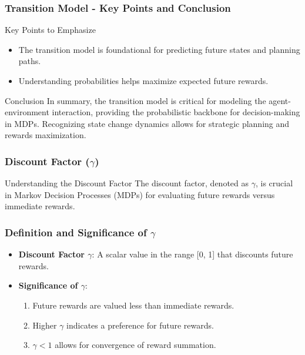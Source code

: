 \documentclass[aspectratio=169]{beamer}
\begin{document}
\begin{frame}[fragile]
    \frametitle{Transition Model - Key Points and Conclusion}
    \begin{block}{Key Points to Emphasize}
        \begin{itemize}
            \item The transition model is foundational for predicting future states and planning paths.
            \item Understanding probabilities helps maximize expected future rewards.
        \end{itemize}
    \end{block}
    \begin{block}{Conclusion}
        In summary, the transition model is critical for modeling the agent-environment interaction, providing the probabilistic backbone for decision-making in MDPs. 
        Recognizing state change dynamics allows for strategic planning and rewards maximization.
    \end{block}
\end{frame}

\begin{frame}[fragile]
    \frametitle{Discount Factor (\( \gamma \))}
    \begin{block}{Understanding the Discount Factor}
        The discount factor, denoted as \( \gamma \), is crucial in Markov Decision Processes (MDPs) for evaluating future rewards versus immediate rewards.
    \end{block}
\end{frame}

\begin{frame}[fragile]
    \frametitle{Definition and Significance of \( \gamma \)}
    \begin{itemize}
        \item \textbf{Discount Factor \( \gamma \)}: A scalar value in the range [0, 1] that discounts future rewards.
        \item \textbf{Significance of \( \gamma \)}:
        \begin{enumerate}
            \item Future rewards are valued less than immediate rewards.
            \item Higher \( \gamma \) indicates a preference for future rewards.
            \item \( \gamma < 1 \) allows for convergence of reward summation.
        \end{enumerate}
    \end{itemize}
\end{frame}
\end{document}
